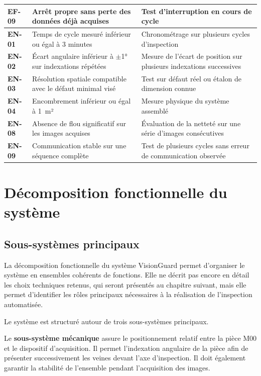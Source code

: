 \begin{longtable}{|p{1.3cm}|p{7cm}|p{7.2cm}|}
\textbf{EF-09} & Arrêt propre sans perte des données déjà acquises
    & Test d'interruption en cours de cycle \\ \hline
\textbf{EN-01} & Temps de cycle mesuré inférieur ou égal à 3 minutes
    & Chronométrage sur plusieurs cycles d'inspection \\ \hline
\textbf{EN-02} & Écart angulaire inférieur à $\pm$1° sur indexations répétées
    & Mesure de l'écart de position sur plusieurs indexations successives \\ \hline
\textbf{EN-03} & Résolution spatiale compatible avec le défaut minimal visé
    & Test sur défaut réel ou étalon de dimension connue \\ \hline
\textbf{EN-04} & Encombrement inférieur ou égal à 1~m²
    & Mesure physique du système assemblé \\ \hline
\textbf{EN-08} & Absence de flou significatif sur les images acquises
    & Évaluation de la netteté sur une série d'images consécutives \\ \hline
\textbf{EN-09} & Communication stable sur une séquence complète
    & Test de plusieurs cycles sans erreur de communication observée \\ \hline
\end{longtable}

\section{Décomposition fonctionnelle du système}

\subsection{Sous-systèmes principaux}
\label{sec:decomposition}

La décomposition fonctionnelle du système VisionGuard permet d'organiser le système en
ensembles cohérents de fonctions. Elle ne décrit pas encore en détail les choix techniques
retenus, qui seront présentés au chapitre suivant, mais elle permet d'identifier les rôles
principaux nécessaires à la réalisation de l'inspection automatisée.

Le système est structuré autour de trois sous-systèmes principaux.

Le \textbf{sous-système mécanique} assure le positionnement relatif entre la pièce M00 et
le dispositif d'acquisition. Il permet l'indexation angulaire de la pièce afin de présenter
successivement les veines devant l'axe d'inspection. Il doit également garantir la
stabilité de l'ensemble pendant l'acquisition des images.

